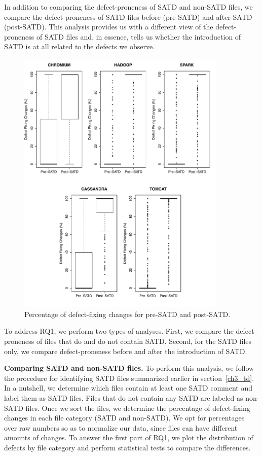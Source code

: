In addition to comparing the defect-proneness of SATD and non-SATD files, we compare the defect-proneness of SATD files before (pre-SATD) and after SATD (post-SATD). This analysis provides us with a different view of the defect-proneness of SATD files and, in essence, tells us whether the introduction of SATD is at all related to the defects we observe.



\begin{figure}[tb]
	\centering
	\includegraphics[width=100mm]{figures/chapter3/rq1-2_correction}
	\caption{Percentage of defect-fixing changes for  pre-SATD and post-SATD.}
	\label{figure:preVpost}
\end{figure}

 To address RQ1, we perform two types of analyses. First, we compare the defect-proneness of files that do and do not contain SATD. Second, for the SATD files only, we compare defect-proneness before and after the introduction of SATD.

\noindent\textbf{Comparing SATD and non-SATD files.} To perform this analysis, we follow the procedure for identifying SATD files summarized earlier in section~\ref{ch3_td}. In a nutshell, we determine which files contain at least one SATD comment and label them as SATD files. Files that do not contain any SATD are labeled as non-SATD files. Once we sort the files, we determine the percentage of defect-fixing changes in each file category (SATD and non-SATD). We opt for percentages over raw numbers so as to normalize our data, since files can have different amounts of changes. To answer the first part of RQ1, we plot the distribution of defects by file category and perform statistical tests to compare the differences.

